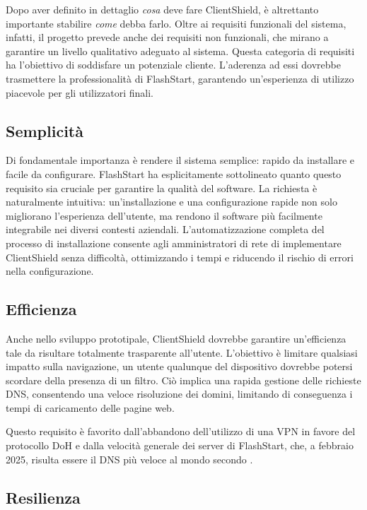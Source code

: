 \documentclass[12pt,a4paper,openright,twoside]{book}
\begin{document}
Dopo aver definito in dettaglio \textit{cosa} deve fare ClientShield, è altrettanto importante stabilire \textit{come} debba farlo.
Oltre ai requisiti funzionali del sistema, infatti, il progetto prevede anche dei requisiti non funzionali, che mirano a garantire un livello qualitativo adeguato al sistema.
Questa categoria di requisiti ha l'obiettivo di soddisfare un potenziale cliente.
L'aderenza ad essi dovrebbe trasmettere la professionalità di FlashStart, garantendo un'esperienza di utilizzo piacevole per gli utilizzatori finali.

\subsection*{Semplicità}

Di fondamentale importanza è rendere il sistema semplice: rapido da installare e facile da configurare.  
FlashStart ha esplicitamente sottolineato quanto questo requisito sia cruciale per garantire la qualità del software.
La richiesta è naturalmente intuitiva: un'installazione e una configurazione rapide non solo migliorano l’esperienza dell’utente, ma rendono il software più facilmente integrabile nei diversi contesti aziendali.  
L'automatizzazione completa del processo di installazione consente agli amministratori di rete di implementare ClientShield senza difficoltà, ottimizzando i tempi e riducendo il rischio di errori nella configurazione.  

\subsection*{Efficienza}

Anche nello sviluppo prototipale, ClientShield dovrebbe garantire un'efficienza tale da risultare totalmente trasparente all'utente.
L'obiettivo è limitare qualsiasi impatto sulla navigazione, un utente qualunque del dispositivo dovrebbe potersi scordare della presenza di un filtro.
Ciò implica una rapida gestione delle richieste \gls{DNS}, consentendo una veloce risoluzione dei domini, limitando di conseguenza i tempi di caricamento delle pagine web.

Questo requisito è favorito dall'abbandono dell'utilizzo di una \gls{VPN} in favore del protocollo \gls{DoH} e dalla velocità generale dei server di FlashStart, che, a febbraio 2025, risulta essere il \gls{DNS} più veloce al mondo secondo \cite{DNSPerf2025}.

\subsection*{Resilienza}
\end{document}
